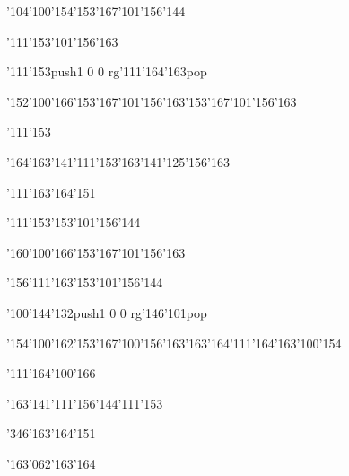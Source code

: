 \null\vfill\ipa\centerline{\enskip\enskip\enskip\enskip\char'104\char'100\char'154\enskip\char'153\char'167\char'101\char'156\char'144}\medskip\centerline{\enskip\char'111\enskip\enskip\enskip\enskip\enskip\char'153\char'101\char'156\char'163\enskip\enskip\enskip}\medskip\centerline{\enskip\enskip\enskip\enskip\enskip\enskip\enskip\enskip\enskip\enskip\enskip\enskip}\medskip\centerline{\enskip\char'111\char'153\enskip\pdfcolorstack\match push{1 0 0 rg}\char'111\char'164\char'163\pdfcolorstack\match pop{}\enskip\enskip\enskip\enskip\enskip\enskip\enskip}\medskip\centerline{\enskip\char'152\char'100\char'166\enskip\char'153\char'167\char'101\char'156\char'163\enskip\char'153\char'167\char'101\char'156\char'163\enskip\enskip\enskip}\medskip\centerline{\enskip\enskip\enskip\enskip\enskip\enskip\enskip\enskip\enskip\enskip\enskip\enskip\enskip\enskip\enskip\char'111\char'153}\medskip\centerline{\enskip\char'164\char'163\char'141\char'111\char'153\enskip\enskip\enskip\enskip\char'163\char'141\char'125\char'156\char'163\enskip\enskip\enskip}\medskip\centerline{\enskip\char'111\enskip\char'163\char'164\char'151\enskip\enskip\enskip\enskip\enskip\enskip}\medskip\centerline{\enskip\char'111\char'153\enskip\enskip\enskip\enskip\enskip\enskip\enskip\enskip\char'153\char'101\char'156\char'144}\medskip\vfill\footline{\hfil\tt\folio\hfil}\eject
\null\vfill\ipa\centerline{\enskip\enskip\enskip\enskip\char'160\char'100\char'166\enskip\char'153\char'167\char'101\char'156\char'163}\medskip\centerline{\enskip\enskip\enskip\char'156\char'111\char'163\enskip\char'153\char'101\char'156\char'144\enskip\enskip\enskip}\medskip\centerline{\enskip\enskip\enskip\enskip\enskip\enskip\enskip\enskip\enskip\enskip\enskip\enskip}\medskip\centerline{\enskip\enskip\enskip\enskip\char'100\char'144\char'132\enskip\pdfcolorstack\match push{1 0 0 rg}\char'146\char'101\pdfcolorstack\match pop{}\enskip\enskip\enskip\enskip}\medskip\centerline{\enskip\char'154\char'100\char'162\enskip\char'153\char'167\char'100\char'156\char'163\enskip\char'163\char'164\char'111\char'164\char'163\enskip\char'100\char'154}\medskip\centerline{\enskip\char'111\enskip\char'164\char'100\char'166\enskip\enskip\enskip\enskip\enskip\enskip\enskip\enskip\enskip\enskip\enskip}\medskip\centerline{\enskip\enskip\enskip\enskip\enskip\enskip\enskip\enskip\enskip\enskip\char'163\char'141\char'111\char'156\char'144\enskip\char'111\char'153}\medskip\centerline{\enskip\char'346\enskip\char'163\char'164\char'151\enskip\enskip\enskip\enskip\enskip\enskip}\medskip\centerline{\enskip\enskip\enskip\enskip\enskip\enskip\enskip\enskip\enskip\enskip\enskip\char'163\char'062\char'163\char'164}\medskip\vfill\footline{\hfil\tt\folio\hfil}\eject
